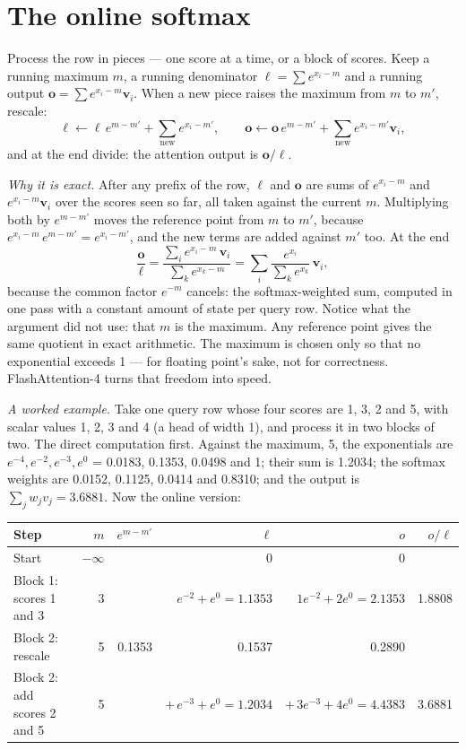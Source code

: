 \section{The online softmax}

Process the row in pieces --- one score at a time, or a block of scores. Keep a
running maximum $m$, a running denominator $\ell=\sum e^{x_i-m}$ and a running
output $\mathbf{o}=\sum e^{x_i-m}\mathbf{v}_i$. When a new piece raises the
maximum from $m$ to $m'$, rescale:
\begin{equation}
\ell \leftarrow \ell\,e^{m-m'} + \sum_{\text{new}} e^{x_i-m'},\qquad
\mathbf{o} \leftarrow \mathbf{o}\,e^{m-m'} + \sum_{\text{new}} e^{x_i-m'}\mathbf{v}_i,
\label{eq:online-softmax}
\end{equation}
and at the end divide: the attention output is $\mathbf{o}/\ell$.

\emph{Why it is exact.} After any prefix of the row, $\ell$ and $\mathbf{o}$
are sums of $e^{x_i-m}$ and $e^{x_i-m}\mathbf{v}_i$ over the scores seen so far,
all taken against the current $m$. Multiplying both by $e^{m-m'}$ moves the
reference point from $m$ to $m'$, because $e^{x_i-m}\,e^{m-m'} = e^{x_i-m'}$,
and the new terms are added against $m'$ too. At the end
\[
\frac{\mathbf{o}}{\ell}
= \frac{\sum_i e^{x_i-m}\,\mathbf{v}_i}{\sum_k e^{x_k-m}}
= \sum_i \frac{e^{x_i}}{\sum_k e^{x_k}}\,\mathbf{v}_i ,
\]
because the common factor $e^{-m}$ cancels: the softmax-weighted sum, computed
in one pass with a constant amount of state per query row. Notice what the
argument did not use: that $m$ is the maximum. Any reference point gives the
same quotient in exact arithmetic. The maximum is chosen only so that no
exponential exceeds 1 --- for floating point's sake, not for correctness.
FlashAttention-4 turns that freedom into speed.

\emph{A worked example.} Take one query row whose four scores are 1, 3, 2 and 5,
with scalar values 1, 2, 3 and 4 (a head of width 1), and process it in two
blocks of two. The direct computation first. Against the maximum, 5, the
exponentials are $e^{-4}, e^{-2}, e^{-3}, e^{0}$ = 0.0183, 0.1353, 0.0498 and 1;
their sum is 1.2034; the softmax weights are 0.0152, 0.1125, 0.0414 and 0.8310;
and the output is $\sum_j w_j v_j = 3.6881$. Now the online version:

\begin{center}\small
\begin{tabular}{@{}lrrrrr@{}}
\toprule
Step & $m$ & $e^{m-m'}$ & $\ell$ & $o$ & $o/\ell$ \\
\midrule
Start & $-\infty$ & & 0 & 0 & \\
Block 1: scores 1 and 3 & 3 & & $e^{-2} + e^{0} = 1.1353$ & $1e^{-2} + 2e^{0} = 2.1353$ & 1.8808 \\
Block 2: rescale & 5 & 0.1353 & 0.1537 & 0.2890 & \\
Block 2: add scores 2 and 5 & 5 & & $+\,e^{-3} + e^{0} = 1.2034$ & $+\,3e^{-3} + 4e^{0} = 4.4383$ & 3.6881 \\
\bottomrule
\end{tabular}
\end{center}

